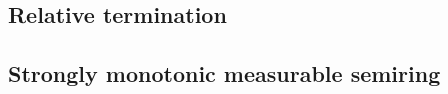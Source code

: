 \subsection{Relative termination}
  \label{preliminaries:relative_termination}


 
\subsection{Strongly monotonic measurable semiring}
\label{sec:strongly_monotonic_measurable_semiring}
